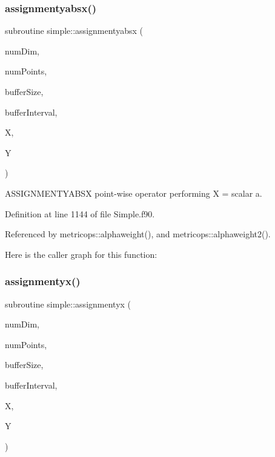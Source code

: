 \subsubsection{\texorpdfstring{assignmentyabsx()}{assignmentyabsx()}}
{\footnotesize\ttfamily subroutine simple\+::assignmentyabsx (\begin{DoxyParamCaption}\item[{integer(kind=4), intent(in)}]{num\+Dim,  }\item[{integer(kind=8), intent(in)}]{num\+Points,  }\item[{integer(kind=8), dimension(numdim), intent(in)}]{buffer\+Size,  }\item[{integer(kind=8), dimension(2$\ast$numdim), intent(in)}]{buffer\+Interval,  }\item[{real(kind=8), dimension(numpoints), intent(in)}]{X,  }\item[{real(kind=8), dimension(numpoints), intent(out)}]{Y }\end{DoxyParamCaption})}



A\+S\+S\+I\+G\+N\+M\+E\+N\+T\+Y\+A\+B\+SX point-\/wise operator performing X = scalar a. 



Definition at line 1144 of file Simple.\+f90.



Referenced by metricops\+::alphaweight(), and metricops\+::alphaweight2().

Here is the caller graph for this function\+:
\hypertarget{namespacesimple_add60911ad92b480355ff35648750c006}{}\label{namespacesimple_add60911ad92b480355ff35648750c006} 
\subsubsection{\texorpdfstring{assignmentyx()}{assignmentyx()}}
{\footnotesize\ttfamily subroutine simple\+::assignmentyx (\begin{DoxyParamCaption}\item[{integer(kind=4), intent(in)}]{num\+Dim,  }\item[{integer(kind=8), intent(in)}]{num\+Points,  }\item[{integer(kind=8), dimension(numdim), intent(in)}]{buffer\+Size,  }\item[{integer(kind=8), dimension(2$\ast$numdim), intent(in)}]{buffer\+Interval,  }\item[{real(kind=8), dimension(numpoints), intent(in)}]{X,  }\item[{real(kind=8), dimension(numpoints), intent(inout)}]{Y }\end{DoxyParamCaption})}



